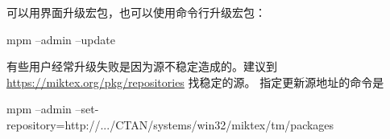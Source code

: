 
\MiKTeX{}
可以用界面升级宏包，也可以使用命令行升级宏包：
\begin{shcode}
  mpm --admin --update
\end{shcode}

有些用户经常升级失败是因为源不稳定造成的。建议到
\url{https://miktex.org/pkg/repositories} 找稳定的源。
指定更新源地址的命令是
\begin{shcode}
  mpm --admin --set-repository=http://.../CTAN/systems/win32/miktex/tm/packages
\end{shcode}

%
%
%
%
%
%
%



